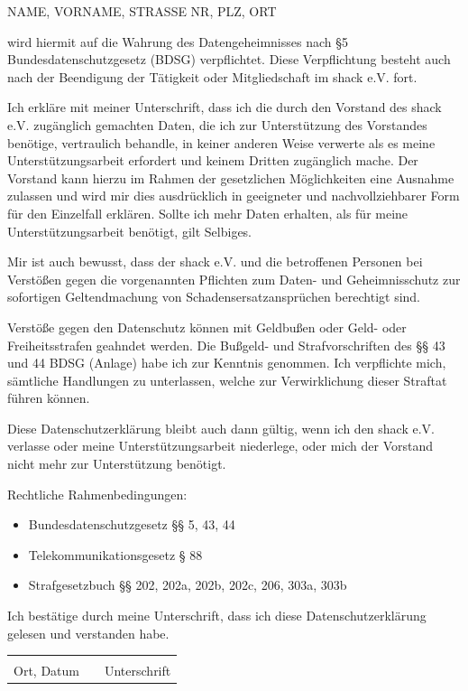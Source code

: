 \documentclass[a4paper]{dinbrief}
\date{\ }
\begin{document}

\begin{letter}{
	}

\subject{}
\opening{}
NAME, VORNAME, STRASSE NR, PLZ, ORT

wird hiermit auf die Wahrung des Datengeheimnisses nach §5 Bundesdatenschutzgesetz (BDSG) verpflichtet.
Diese Verpflichtung besteht auch nach der Beendigung der Tätigkeit oder Mitgliedschaft im shack e.V. fort.

Ich erkläre mit meiner Unterschrift, dass ich die durch den Vorstand des shack e.V. zugänglich gemachten Daten, die ich zur Unterstützung des Vorstandes benötige, vertraulich behandle, in keiner anderen Weise verwerte als es meine Unterstützungsarbeit erfordert und keinem Dritten zugänglich mache. Der Vorstand kann hierzu im Rahmen der gesetzlichen Möglichkeiten eine Ausnahme zulassen und wird mir dies ausdrücklich in geeigneter und nachvollziehbarer Form für den Einzelfall erklären. Sollte ich mehr Daten erhalten, als für meine Unterstützungsarbeit benötigt, gilt Selbiges.

Mir ist auch bewusst, dass der shack e.V. und die betroffenen Personen bei Verstößen gegen die vorgenannten Pflichten zum Daten- und Geheimnisschutz zur sofortigen Geltendmachung von Schadensersatzansprüchen berechtigt sind.

Verstöße gegen den Datenschutz können mit Geldbußen oder Geld- oder Freiheitsstrafen geahndet werden. Die Bußgeld- und Strafvorschriften des §§ 43 und 44 BDSG (Anlage) habe ich zur Kenntnis genommen. Ich verpflichte mich, sämtliche Handlungen zu unterlassen, welche zur Verwirklichung dieser Straftat führen können. 

Diese Datenschutzerklärung bleibt auch dann gültig, wenn ich den shack e.V. verlasse oder meine Unterstützungsarbeit niederlege, oder mich der Vorstand nicht mehr zur Unterstützung benötigt.

Rechtliche Rahmenbedingungen:
\begin{itemize}
	\item Bundesdatenschutzgesetz §§ 5, 43, 44
	\item Telekommunikationsgesetz § 88
	\item Strafgesetzbuch §§ 202, 202a, 202b, 202c, 206, 303a, 303b
\end{itemize}


Ich bestätige durch meine Unterschrift, dass ich diese Datenschutzerklärung gelesen und verstanden habe.

\vfill

\begin{tabular}{lp{2em}l}
	 \hspace{5cm}   && \hspace{5cm} \\\cline{1-1}\cline{3-3}
	 Ort, Datum     && Unterschrift
\end{tabular}

\closing{}
\end{letter}
\end{document}
